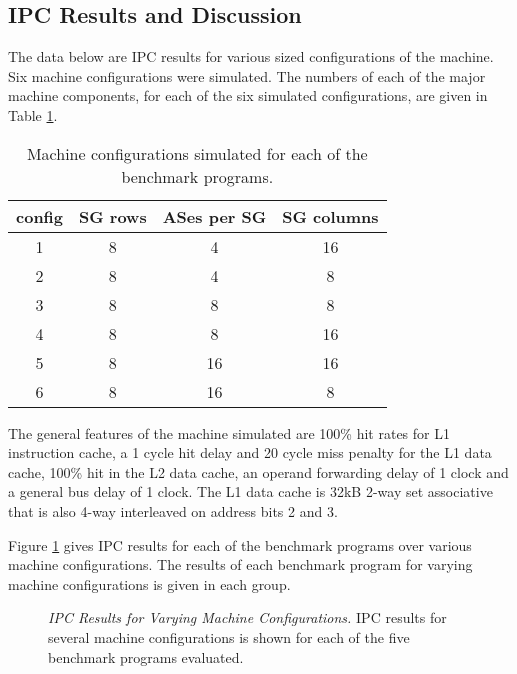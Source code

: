 \documentclass[10pt,dvips]{article}
\begin{document}
\subsection{IPC Results and Discussion}
%
The data below are IPC results for various sized configurations of
the machine.  Six machine configurations were simulated.
The numbers of each of the major machine components, for each of the six
simulated configurations, are given in Table \ref{tab:configs}.

\begin{table}
\begin{center}
\caption{Machine configurations simulated for each of the benchmark
programs.}
\label{tab:configs}
\begin{tabular}{|c|c|c|c|}
\hline 
config&
SG rows&
ASes per SG&
SG columns\\
\hline
\hline 
1&
8&
4&
16\\
\hline 
2&
8&
4&
8\\
\hline 
3&
8&
8&
8\\
\hline 
4&
8&
8&
16\\
\hline 
5&
8&
16&
16\\
\hline 
6&
8&
16&
8\\
\hline
\end{tabular}
\end{center}
\end{table}

The general features of
the machine simulated are 100\% hit rates for L1 instruction cache,
a 1 cycle hit delay and 20 cycle miss penalty for the L1 data cache,
100\% hit in the L2 data cache, an operand forwarding delay of 1 clock
and a general bus delay of 1 clock.  The L1 data cache is 32kB 2-way
set associative that is also 4-way interleaved on address bits 2 and 3.

Figure \ref{fig:ipc} gives IPC results for each of the benchmark
programs over various machine configurations.
The results of each benchmark program for varying machine
configurations is given in each group.  

\begin{figure}
\vspace{0.2 in}
\setlength{\epsfxsize}{10cm}%
\centerline{}
\caption{{\em IPC Results for Varying Machine Configurations.} 
IPC results for several machine configurations is shown for each of
the five benchmark programs evaluated.}
\label{fig:ipc}
\end{figure}
\end{document}
